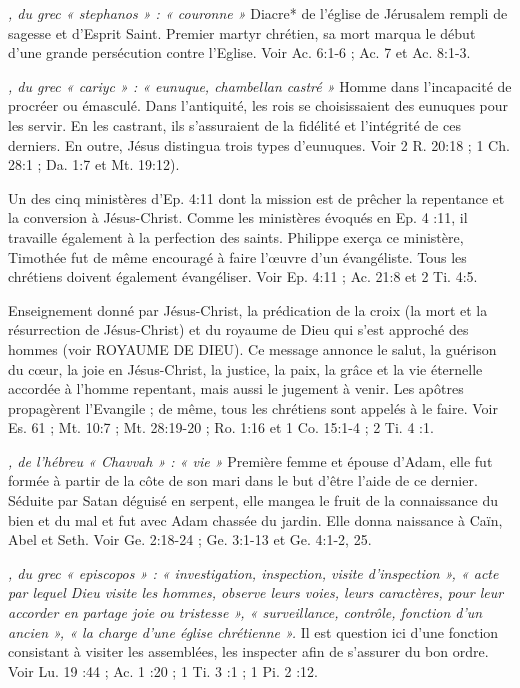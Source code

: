 \begin{multicols}{2}
{\textit{, du grec « stephanos » : « couronne »}\newline
Diacre* de l'église de Jérusalem rempli de sagesse et d'Esprit Saint. Premier martyr chrétien, sa mort marqua le début d'une grande persécution contre l'Eglise. Voir Ac. 6:1-6 ; Ac. 7 et Ac. 8:1-3.

\textit{, du grec « cariyc » : « eunuque, chambellan castré »}\newline
Homme dans l'incapacité de procréer ou émasculé. Dans l'antiquité, les rois se choisissaient des eunuques pour les servir. En les castrant, ils s'assuraient de la fidélité et l'intégrité de ces derniers. En outre, Jésus distingua trois types d'eunuques. Voir 2 R. 20:18 ; 1 Ch. 28:1 ; Da. 1:7 et Mt. 19:12).

\textit{}\newline
Un des cinq ministères d'Ep. 4:11 dont la mission est de prêcher la repentance et la conversion à Jésus-Christ. Comme les ministères évoqués en Ep. 4 :11, il travaille également à la perfection des saints. Philippe exerça ce ministère, Timothée fut de même encouragé à faire l'œuvre d'un évangéliste. Tous les chrétiens doivent également évangéliser. Voir Ep. 4:11 ; Ac. 21:8 et 2 Ti. 4:5.

\textit{}\newline
Enseignement donné par Jésus-Christ, la prédication de la croix (la mort et la résurrection de Jésus-Christ) et du royaume de Dieu qui s'est approché des hommes (voir ROYAUME DE DIEU). Ce message annonce le salut, la guérison du cœur, la joie en Jésus-Christ, la justice, la paix, la grâce et la vie éternelle accordée à l'homme repentant, mais aussi le jugement à venir. Les apôtres propagèrent l'Evangile ; de même, tous les chrétiens sont appelés à le faire. Voir Es. 61 ; Mt. 10:7 ; Mt. 28:19-20 ; Ro. 1:16 et 1 Co. 15:1-4 ; 2 Ti. 4 :1.

\textit{, de l'hébreu « Chavvah » : « vie »}\newline
Première femme et épouse d'Adam, elle fut formée à partir de la côte de son mari dans le but d'être l'aide de ce dernier. Séduite par Satan déguisé en serpent, elle mangea le fruit de la connaissance du bien et du mal et fut avec Adam chassée du jardin. Elle donna naissance à Caïn, Abel et Seth. Voir Ge. 2:18-24 ; Ge. 3:1-13 et Ge. 4:1-2, 25.

\textit{, du grec « episcopos » : « investigation, inspection, visite d'inspection », « acte par lequel Dieu visite les hommes, observe leurs voies, leurs caractères, pour leur accorder en partage joie ou tristesse », « surveillance, contrôle, fonction d'un ancien », « la charge d'une église chrétienne ».}\newline
Il est question ici d'une fonction consistant à visiter les assemblées, les inspecter afin de s'assurer du bon ordre. Voir Lu. 19 :44 ; Ac. 1 :20 ; 1 Ti. 3 :1 ; 1 Pi. 2 :12.

}
\end{multicols}
